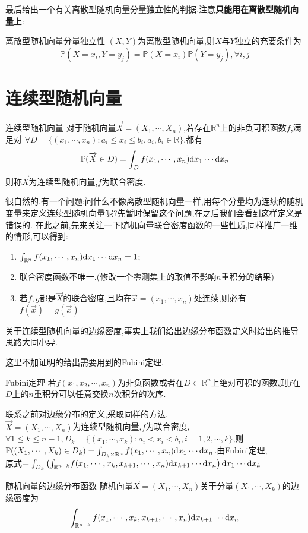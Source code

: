 \documentclass[lang=cn,10pt]{elegantbook}
\begin{document}
最后给出一个有关离散型随机向量分量独立性的判据,注意\textbf{只能用在离散型随机向量}上:
\begin{theorem}{离散型随机向量分量独立性}{}
    $(X,Y)$为离散型随机向量,则$X$与$Y$独立的充要条件为
    $$\mathbb{P}(X=x_i,Y=y_j)=\mathbb{P}(X=x_i)\mathbb{P}(Y=y_j),\forall i,j$$
\end{theorem}
\newpage
\section{连续型随机向量}
\begin{definition}{连续型随机向量}{}
    对于随机向量$\overrightarrow{X}=(X_1,\cdots,X_n)$,若存在$\mathbb{R}^n$上的非负可积函数$f$,满足对
    $\forall D=\{(x_1,\cdots,x_n):a_i\leq x_i\leq b_i,a_i,b_i\in\mathbb{R}\}$,都有
    $$\mathbb{P}(\overrightarrow{X}\in D)=\int_D f(x_1,\cdots,x_n) {\rm d}x_1\cdots {\rm d}x_n$$
    则称$\overrightarrow{X}$为连续型随机向量,$f$为联合密度.
\end{definition}

很自然的,有一个问题:问什么不像离散型随机向量一样,用每个分量均为连续的随机变量来定义连续型随机向量呢?先暂时保留这个问题,在之后我们会看到这样定义是错误的.
在此之前,先来关注一下随机向量联合密度函数的一些性质,同样推广一维的情形,可以得到:
\begin{enumerate}
    \item $\int_{\mathbb{R}^n}f(x_1,\cdots,x_n){\rm d}x_1\cdots{\rm d}x_n=1$;
    \item 联合密度函数不唯一.(修改一个零测集上的取值不影响$n$重积分的结果)
    \item 若$f,g$都是$\overrightarrow{X}$的联合密度,且均在$\overrightarrow{x}=(x_1,\cdots,x_n)$处连续,则必有$f(\overrightarrow{x})=g(\overrightarrow{x})$
\end{enumerate}
关于连续型随机向量的边缘密度,事实上我们给出边缘分布函数定义时给出的推导思路大同小异.

这里不加证明的给出需要用到的Fubini定理.
\begin{theorem}{Fubini定理}{}
    若$f(x_1,x_2,\cdots,x_n)$为非负函数或者在$D\subset\mathbb{R}^n$上绝对可积的函数,则$f$在$D$上的$n$重积分可以任意交换$n$次积分的次序.
\end{theorem}
联系之前对边缘分布的定义,采取同样的方法.\\
$\overrightarrow{X}=(X_1,\cdots,X_n)$为连续型随机向量,$f$为联合密度,$\forall 1\leq k\leq n-1,D_k=\{(x_1,\cdots,x_k):a_i<x_i<b_i,i=1,2,\cdots,k\}$,则
$\mathbb{P}((X_1,\cdots,X_k)\in D_k)=\int_{D_k\times\mathbb{R}^n}f(x_1,\cdots,x_n){\rm d}x_1\cdots{\rm d}x_n$.由Fubini定理,\\
原式$=\int_{D_k}\left({\int_{\mathbb{R}^{n-k}}}f(x_1,\cdots,x_k,x_{k+1},\cdots,x_n){\rm d}x_{k+1}\cdots{\rm d}x_n\right){\rm d}x_1\cdots{\rm d}x_k$
\begin{definition}{随机向量的边缘分布函数}{}
    随机向量$\overrightarrow{X}=(X_1,\cdots,X_n)$关于分量$(X_1,\cdots,X_k)$的边缘密度为
    $$\int_{\mathbb{R}^{n-k}}f(x_1,\cdots,x_k,x_{k+1},\cdots,x_n){\rm d}x_{k+1}\cdots{\rm d}x_n$$
\end{definition}
\end{document}
